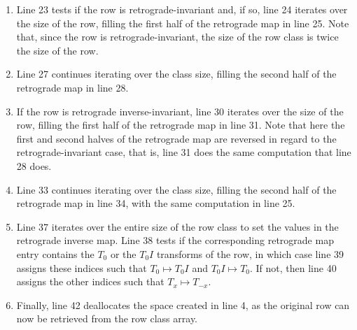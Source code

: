 \begin{enumerate}
\addtocounter{enumi}{6}
\item Line 23 tests if the row is retrograde-invariant and, if so, line 24 iterates over the size of the row, filling the first half of the retrograde map in line 25. Note that, since the row is retrograde-invariant, the size of the row class is twice the size of the row.
\addtocounter{enumi}{3}
\item Line 27 continues iterating over the class size, filling the second half of the retrograde map in line 28.
\addtocounter{enumi}{2}
\item If the row is retrograde inverse-invariant, line 30 iterates over the size of the row, filling the first half of the retrograde map in line 31. Note that here the first and second halves of the retrograde map are reversed in regard to the retrograde-invariant case, that is, line 31 does the same computation that line 28 does.
\addtocounter{enumi}{2}
\item Line 33 continues iterating over the class size, filling the second half of the retrograde map in line 34, with the same computation in line 25.
\addtocounter{enumi}{3}
\item Line 37 iterates over the entire size of the row class to set the values in the retrograde inverse map. Line 38 tests if the corresponding retrograde map entry contains the $T_0$ or the $T_0I$ transforms of the row, in which case line 39 assigns these indices such that $T_0 \mapsto T_0I$ and $T_0I \mapsto T_0$. If not, then line 40 assigns the other indices such that $T_x \mapsto T_{-x}$.
\addtocounter{enumi}{4}
\item Finally, line 42 deallocates the space created in line 4, as the original row can now be retrieved from the row class array.
\end{enumerate}

